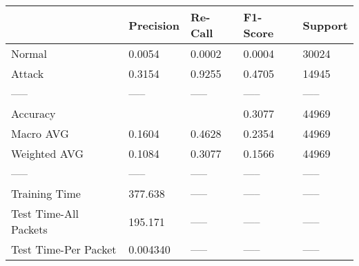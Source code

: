 \begin{tabular}{lllll}
\toprule
{} & Precision & Re-Call & F1-Score & Support \\
\midrule
Normal                &    0.0054 &  0.0002 &   0.0004 &   30024 \\
Attack                &    0.3154 &  0.9255 &   0.4705 &   14945 \\
-----                 &     ----- &   ----- &    ----- &   ----- \\
Accuracy              &           &         &   0.3077 &   44969 \\
Macro AVG             &    0.1604 &  0.4628 &   0.2354 &   44969 \\
Weighted AVG          &    0.1084 &  0.3077 &   0.1566 &   44969 \\
-----                 &     ----- &   ----- &    ----- &   ----- \\
Training Time         &   377.638 &   ----- &    ----- &   ----- \\
Test Time-All Packets &   195.171 &   ----- &    ----- &   ----- \\
Test Time-Per Packet  &  0.004340 &   ----- &    ----- &   ----- \\
\bottomrule
\end{tabular}
